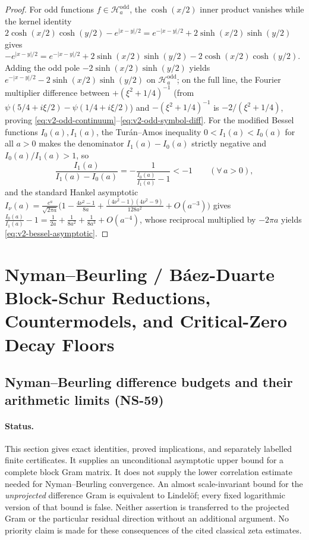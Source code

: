 \documentclass[11pt]{article}
\theoremstyle{remark}
\begin{document}
\begin{proof}
For odd functions $f\in\mathcal H_a^{\mathrm{odd}}$, the $\cosh(x/2)$ inner product vanishes while the kernel identity $2\cosh(x/2)\cosh(y/2)-e^{|x-y|/2}=e^{-|x-y|/2}+2\sinh(x/2)\sinh(y/2)$ gives $-e^{|x-y|/2}=e^{-|x-y|/2}+2\sinh(x/2)\sinh(y/2)-2\cosh(x/2)\cosh(y/2)$. Adding the odd pole $-2\sinh(x/2)\sinh(y/2)$ yields $e^{-|x-y|/2}-2\sinh(x/2)\sinh(y/2)$ on $\mathcal H_a^{\mathrm{odd}}$; on the full line, the Fourier multiplier difference between $+(\xi^2+1/4)^{-1}$ (from $\psi(5/4+i\xi/2)-\psi(1/4+i\xi/2)$) and $-(\xi^2+1/4)^{-1}$ is $-2/(\xi^2+1/4)$, proving \eqref{eq:v2-odd-continuum}--\eqref{eq:v2-odd-symbol-diff}. For the modified Bessel functions $I_0(a),I_1(a)$, the Tur\'an--Amos inequality $0 < I_1(a) < I_0(a)$ for all $a>0$ makes the denominator $I_1(a)-I_0(a)$ strictly negative and $I_0(a)/I_1(a) > 1$, so
\[
 \frac{I_1(a)}{I_1(a)-I_0(a)} = -\frac{1}{\frac{I_0(a)}{I_1(a)}-1} < -1\qquad (\forall\,a>0),
\]
and the standard Hankel asymptotic $I_\nu(a) = \frac{e^a}{\sqrt{2\pi a}}\bigl(1 - \frac{4\nu^2-1}{8a} + \frac{(4\nu^2-1)(4\nu^2-9)}{128a^2} + O(a^{-3})\bigr)$ gives $\frac{I_0(a)}{I_1(a)} - 1 = \frac{1}{2a} + \frac{1}{8a^2} + \frac{1}{8a^3} + O(a^{-4})$, whose reciprocal multiplied by $-2\pi a$ yields \eqref{eq:v2-bessel-asymptotic}.
\end{proof}

\section{Nyman--Beurling / B\'aez-Duarte Block-Schur Reductions, Countermodels, and Critical-Zero Decay Floors}\label{sec:pillar4}
\subsection{Nyman--Beurling difference budgets and their arithmetic limits (NS-59)}
\label{sec:v158-nb-difference}

\paragraph{Status.}
This section gives exact identities, proved implications, and separately
labelled finite certificates. It supplies an unconditional asymptotic upper
bound for a complete block Gram matrix. It does not supply the lower
correlation estimate needed for Nyman--Beurling convergence. An almost
scale-invariant bound for the \emph{unprojected} difference Gram is equivalent
to Lindel\"of; every fixed logarithmic version of that bound is false.
Neither assertion is transferred to the projected Gram or the particular
residual direction without an additional argument. No priority claim is made
for these consequences of the cited classical zeta estimates.
\end{document}
